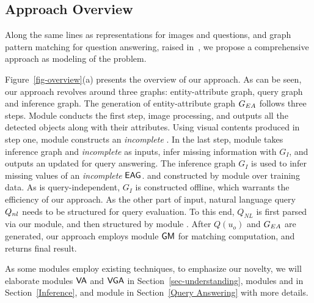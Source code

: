 \subsection{Approach Overview}
\label{sec-architecture}


Along the same lines as representations for images and questions, and graph pattern matching for question answering, raised in~\cite{peixi2019}, we propose a comprehensive approach as modeling of the \vqa problem. %

Figure~\ref{fig-overview}(a) presents the overview of our approach. As can be seen, our approach revolves around three graphs: entity-attribute graph, query graph and inference graph. The generation of entity-attribute graph $G_{EA}$ follows three steps. Module  conducts the first step, \ie image processing, and outputs all the detected objects along with their attributes. Using visual contents produced in step one, module  constructs an {\em incomplete} . In the last step, module  takes inference graph and {\em incomplete}  as inputs, infer missing information with $G_I$, and outputs an updated  for query answering. 
The inference graph $G_I$ is used to infer missing values of an {\em incomplete} ${\mathsf{EAG}}$. %
and constructed by module  over training data. As is query-independent, $G_I$ is constructed offline, which warrants the efficiency of our approach. %
As the other part of input, natural language query $Q_{nl}$ needs to be structured for query evaluation. To this end, $Q_{NL}$ is first parsed via our  module, and then structured by module . After $Q(u_o)$ and $G_{EA}$ are generated, our approach employs module ${\mathsf{GM}}$ for matching computation, and returns final result.  %


As some modules employ existing techniques, to emphasize our novelty, we will elaborate modules ${\mathsf{VA}}$ and ${\mathsf{VGA}}$ in Section~\ref{sec-understanding}, modules  and  in Section~\ref{Inference}, and module  in Section~\ref{Query Answering} with more details. 